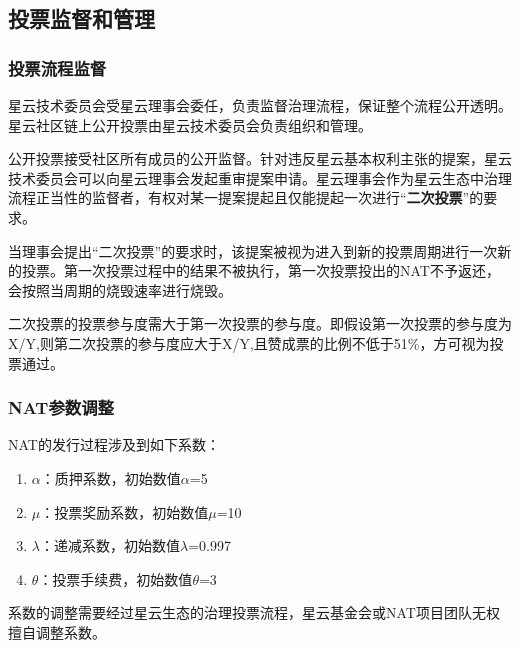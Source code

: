 \subsection{投票监督和管理}

\subsubsection{投票流程监督}
\label{second-vote}

星云技术委员会受星云理事会委任，负责监督治理流程，保证整个流程公开透明。星云社区链上公开投票由星云技术委员会负责组织和管理。

公开投票接受社区所有成员的公开监督。针对违反星云基本权利主张的提案，星云技术委员会可以向星云理事会发起重审提案申请。星云理事会作为星云生态中治理流程正当性的监督者，有权对某一提案提起且仅能提起一次进行“\textbf{二次投票}”的要求。

当理事会提出“二次投票”的要求时，该提案被视为进入到新的投票周期进行一次新的投票。第一次投票过程中的结果不被执行，第一次投票投出的NAT不予返还，会按照当周期的烧毁速率进行烧毁。

二次投票的投票参与度需大于第一次投票的参与度。即假设第一次投票的参与度为X/Y,则第二次投票的参与度应大于X/Y,且赞成票的比例不低于51\%，方可视为投票通过。

\subsubsection{NAT参数调整}

NAT的发行过程涉及到如下系数：

\begin{enumerate}
	\item $\alpha$：质押系数，初始数值$\alpha$=5
	\item $\mu$：投票奖励系数，初始数值$\mu$=10
	\item $\lambda$：递减系数，初始数值$\lambda$=0.997
	\item $\theta$：投票手续费，初始数值$\theta$=3
\end{enumerate}

系数的调整需要经过星云生态的治理投票流程，星云基金会或NAT项目团队无权擅自调整系数。




